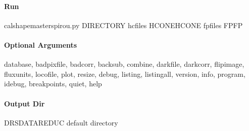 \documentclass[a4paper,10pt,english]{report}
\begin{document}
\paragraph{Run}
\label{\detokenize{user/spirou/recipes/shape_master:run}}
\begin{sphinxVerbatim}[commandchars=\\\{\}]
cal\PYGZus{}shape\PYGZus{}master\PYGZus{}spirou.py \PYG{o}{[}DIRECTORY\PYG{o}{]} \PYGZhy{}hcfiles \PYG{o}{[}HCONE\PYGZus{}HCONE\PYG{o}{]} \PYGZhy{}fpfiles \PYG{o}{[}FP\PYGZus{}FP\PYG{o}{]}
\end{sphinxVerbatim}


\paragraph{Optional Arguments}
\label{\detokenize{user/spirou/recipes/shape_master:optional-arguments}}
\begin{sphinxVerbatim}[commandchars=\\\{\}]
\PYGZhy{}\PYGZhy{}database, \PYGZhy{}\PYGZhy{}badpixfile, \PYGZhy{}\PYGZhy{}badcorr, \PYGZhy{}\PYGZhy{}backsub, \PYGZhy{}\PYGZhy{}combine,
\PYGZhy{}\PYGZhy{}darkfile, \PYGZhy{}\PYGZhy{}darkcorr,  \PYGZhy{}\PYGZhy{}flipimage, \PYGZhy{}\PYGZhy{}fluxunits, \PYGZhy{}\PYGZhy{}locofile,
\PYGZhy{}\PYGZhy{}plot, \PYGZhy{}\PYGZhy{}resize,
\PYGZhy{}\PYGZhy{}debug, \PYGZhy{}\PYGZhy{}listing, \PYGZhy{}\PYGZhy{}listingall, \PYGZhy{}\PYGZhy{}version, \PYGZhy{}\PYGZhy{}info,
\PYGZhy{}\PYGZhy{}program, \PYGZhy{}\PYGZhy{}idebug, \PYGZhy{}\PYGZhy{}breakpoints, \PYGZhy{}\PYGZhy{}quiet, \PYGZhy{}\PYGZhy{}help
\end{sphinxVerbatim}


\paragraph{Output Dir}
\label{\detokenize{user/spirou/recipes/shape_master:output-dir}}
\begin{sphinxVerbatim}[commandchars=\\\{\}]
DRS\PYGZus{}DATA\PYGZus{}REDUC    default  directory
\end{sphinxVerbatim}
\end{document}
